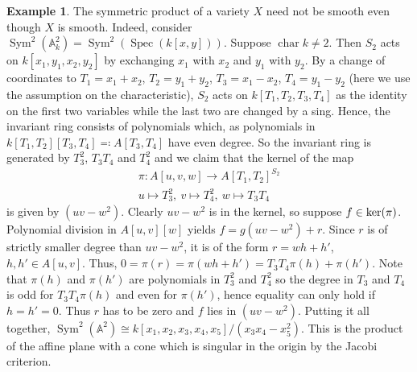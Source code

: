 \documentclass[11pt, a4paper, english, twoside]{article}
\theoremstyle{plain}
\theoremstyle{definition}
\newtheorem{example}[theorem]{Example}
\DeclareMathOperator{\Spec}{Spec}
\DeclareMathOperator{\Sym}{Sym}
\DeclareMathOperator{\chara}{char}
\begin{document}
\begin{example}
    The symmetric product of a variety $X$ need not be smooth even though $X$ is smooth. 
    Indeed, consider $\Sym^2(\mathbb{A}_k^2) = \Sym^2(\Spec(k[x,y]))$. Suppose $\chara k \neq 2$.
    Then $S_2$ acts on $k[x_1,y_1,x_2,y_2]$ by exchanging $x_1$ with $x_2$ and $y_1$ with $y_2$. By a change of coordinates
    to $T_1 = x_1 + x_2$, $T_2 = y_1 + y_2$, $T_3 = x_1 - x_2$, $T_4 = y_1 - y_2$ (here we use the assumption on the characteristic),
    $S_2$ acts on $k[T_1,T_2,T_3,T_4]$ as the identity on the first two variables while the last two are changed by a sing.
    Hence, the invariant ring consists of polynomials which, as polynomials in $k[T_1,T_2][T_3,T_4] \eqqcolon A[T_3,T_4]$ have even degree.
    So the invariant ring is generated by $T_3^2$, $T_3T_4$ and $T_4^2$ and we claim that the kernel of the map
    \begin{gather*}
        \pi \colon A[u,v,w] \to A[T_1,T_2]^{S_2}\\
        u \mapsto T_3^2,\ 
        v \mapsto T_4^2,\ 
        w \mapsto T_3T_4
    \end{gather*}
    is given by $(uv - w^2)$. Clearly $uv - w^2$ is in the kernel, so suppose $f \in \rm{ker}(\pi)$. 
    Polynomial division in $A[u,v][w]$ yields
    $f = g(uv - w^2) + r$. Since $r$ is of strictly smaller degree than $uv - w^2$, it is of the form $r = wh + h'$, $h, h' \in A[u,v]$.
    Thus, $0 = \pi(r) = \pi(wh + h') = T_3T_4\pi(h) + \pi(h')$. 
    Note that $\pi(h)$ and $\pi(h')$ are polynomials in $T_3^2$ and $T_4^2$ so the degree in $T_3$ and $T_4$ is odd for 
    $T_3T_4\pi(h)$ and even for $\pi(h')$,
    hence equality can only hold if $h = h' = 0$. Thus $r$ has to be zero and $f$ lies in $(uv - w^2)$.
    Putting it all together, $\Sym^2(\mathbb{A}^2) \cong k[x_1,x_2,x_3,x_4,x_5]/(x_3x_4 - x_5^2)$. This is the product of the affine plane with
    a cone which is singular in the origin by the Jacobi
    criterion.


\end{example}
\end{document}

